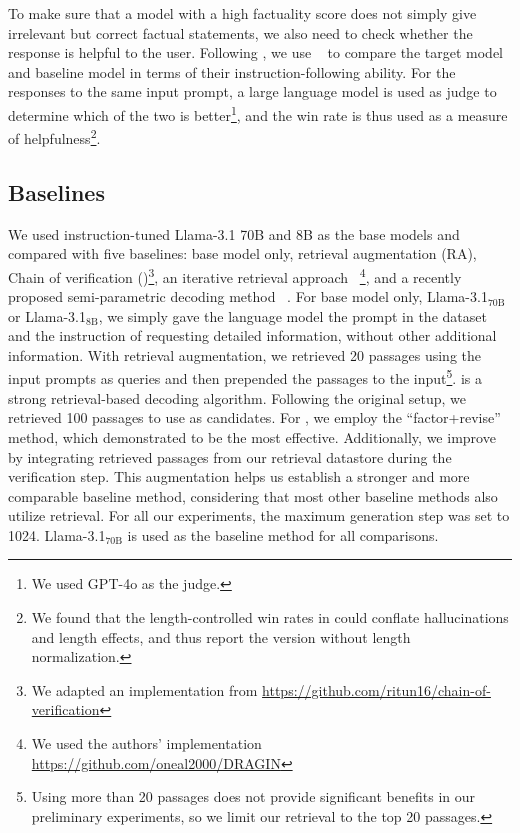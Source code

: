 To make sure that a model with a high factuality score does not simply give irrelevant but correct factual statements, we also need to check whether the response is helpful to the user.
Following \cite{lin2024flame}, we use \alpacaE~\citep{dubois2024lengthcontrolled} to compare the target model and baseline model in terms of their instruction-following ability. 
For the responses to the same input prompt, a large language model is used as judge to determine which of the two is better\footnote{We used GPT-4o as the judge.}, and the win rate is thus used as a measure of helpfulness\footnote{We found that the length-controlled win rates in \alpacaE could conflate hallucinations and length effects, and thus report the version without length normalization.}.



\subsection{Baselines}

We used instruction-tuned Llama-3.1 70B and 8B as the base models and compared \model with five baselines: base model only, retrieval augmentation (RA), Chain of verification (\cove)\footnote{We adapted an implementation from \url{https://github.com/ritun16/chain-of-verification}}, an iterative retrieval approach \dragin~\citep{su-etal-2024-dragin}\footnote{We used the authors' implementation \url{https://github.com/oneal2000/DRAGIN}}, and a recently proposed semi-parametric decoding method \nest~\citep{li2024nearest}.
For base model only, Llama-3.1$_{\text{70B}}$ or Llama-3.1$_{\text{8B}}$, we simply gave the language model the prompt in the dataset and the instruction of requesting detailed information, without other additional information. 
With retrieval augmentation, we retrieved 20 passages using the input prompts as queries and then prepended the  passages to the input\footnote{Using more than 20 passages does not provide significant benefits in our preliminary experiments, so we limit our retrieval to the top 20 passages.}.
\nest is a strong retrieval-based decoding algorithm. Following the original setup, we retrieved 100 passages to use as candidates.
For \cove, we employ the ``factor+revise'' method, which \citet{dhuliawala-etal-2024-chain} demonstrated to be the most effective. Additionally, we improve \cove by integrating retrieved passages from our retrieval datastore during the verification step. This augmentation helps us establish a stronger and more comparable baseline method, considering that most other baseline methods also utilize retrieval.
For all our experiments, the maximum generation step was set to 1024.
Llama-3.1$_{\text{70B}}$ is used as the baseline method for all \alpacaE comparisons. 


